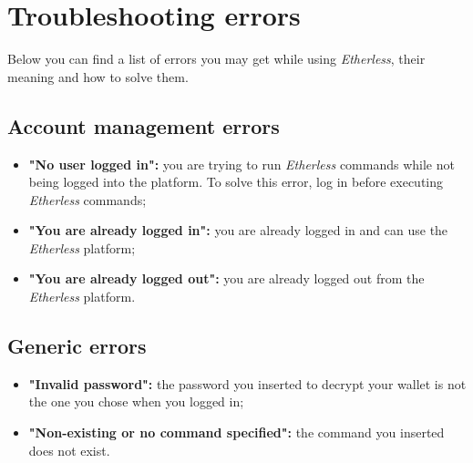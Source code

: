 \section{Troubleshooting errors}
Below you can find a list of errors you may get while using \textit{Etherless}, their meaning and how to solve them.
  \subsection{Account management errors}
    \begin{itemize}
      \item \textbf{"No user logged in":} you are trying to run \textit{Etherless} commands while not being logged into the platform. To solve this error, log in before executing \textit{Etherless} commands;
      \item \textbf{"You are already logged in":} you are already logged in and can use the \textit{Etherless} platform;
      \item \textbf{"You are already logged out":} you are already logged out from the \textit{Etherless} platform.
    \end{itemize}
    
    \subsection{Generic errors}
    \begin{itemize}
    		\item \textbf{"Invalid password":} the password you inserted to decrypt your wallet is not the one you chose when you logged in;
    		\item \textbf{"Non-existing or no command specified":} the command you inserted does not exist.
    \end{itemize}
  
